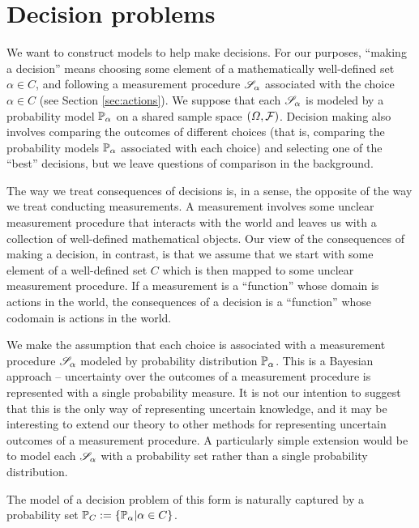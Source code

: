 

\section{Decision problems}\label{sec:dec_probs}

We want to construct models to help make decisions. For our purposes, ``making a decision'' means choosing some element of a mathematically well-defined set $\alpha\in C$, and following a measurement procedure $\mathscr{S}_\alpha$ associated with the choice $\alpha\in C$ (see Section \ref{sec:actions}). We suppose that each $\mathscr{S}_\alpha$ is modeled by a probability model $\mathbb{P}_\alpha$ on a shared sample space $(\Omega,\mathcal{F})$. Decision making also involves comparing the outcomes of different choices (that is, comparing the probability models $\mathbb{P}_\alpha$ associated with each choice) and selecting one of the ``best'' decisions, but we leave questions of comparison in the background.

The way we treat consequences of decisions is, in a sense, the opposite of the way we treat conducting measurements. A measurement involves some unclear measurement procedure that interacts with the world and leaves us with a collection of well-defined mathematical objects. Our view of the consequences of making a decision, in contrast, is that we assume that we start with some element of a well-defined set $C$ which is then mapped to some unclear measurement procedure. If a measurement is a ``function'' whose domain is actions in the world, the consequences of a decision is a ``function'' whose codomain is actions in the world.

We make the assumption that each choice is associated with a measurement procedure $\mathscr{S}_\alpha$ modeled by probability distribution $\mathbb{P}_\alpha$. This is a Bayesian approach -- uncertainty over the outcomes of a measurement procedure is represented with a single probability measure. It is not our intention to suggest that this is the only way of representing uncertain knowledge, and it may be interesting to extend our theory to other methods for representing uncertain outcomes of a measurement procedure. A particularly simple extension would be to model each $\mathscr{S}_\alpha$ with a probability set rather than a single probability distribution. 

The model of a decision problem of this form is naturally captured by a probability set $\mathbb{P}_{C}:=\{\mathbb{P}_\alpha|\alpha\in C\}$. 

